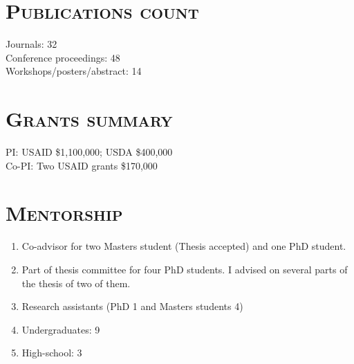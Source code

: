 \documentclass[margin,10pt]{res} %
\begin{document}
\begin{resume}

\section{\textnormal{\textsc{Publications count}}}
Journals: 32\\
Conference proceedings: 48\\
Workshops/posters/abstract: 14\\

\section{\textnormal{\textsc{Grants summary}}}
PI: USAID \$1,100,000; USDA \$400,000\\
Co-PI: Two USAID grants \$170,000

\section{\textnormal{\textsc{Mentorship}}}
\begin{enumerate}[$\circ$]
    \item Co-advisor for two Masters student (Thesis accepted) and one PhD
    student.
    \item Part of thesis committee for four PhD students. I advised on
    several parts of the thesis of two of them.
    \item Research assistants (PhD 1 and Masters students 4)
    \item Undergraduates: 9
    \item High-school: 3
\end{enumerate}


\end{resume}
\end{document}
